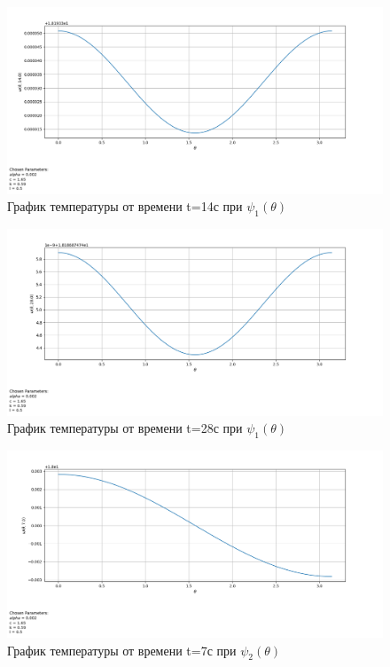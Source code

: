 {{\begin{figure}[H]
    \centering                             
	\includegraphics[width=\textwidth,height=\textheight,keepaspectratio]{kir/var_1_t_14.png}                 
	\caption{ График температуры от времени t=14с при $\psi_1(\theta)$}
	\label{grapics2}                           
\end{figure}                                  

\begin{figure}[H]
    \centering                             
	\includegraphics[width=\textwidth,height=\textheight,keepaspectratio]{kir/var_1_t_28.png}                 
	\caption{ График температуры от времени t=28с при $\psi_1(\theta)$}
	\label{grapics3}                           
\end{figure}              
\begin{figure}[H]
    \centering                             
	\includegraphics[width=\textwidth,height=\textheight,keepaspectratio]{pos/var_2_t_7.png}                 
	\caption{ График температуры от времени t=7с при $\psi_2(\theta)$}
	\label{grapics4}                           
\end{figure}               

}}
